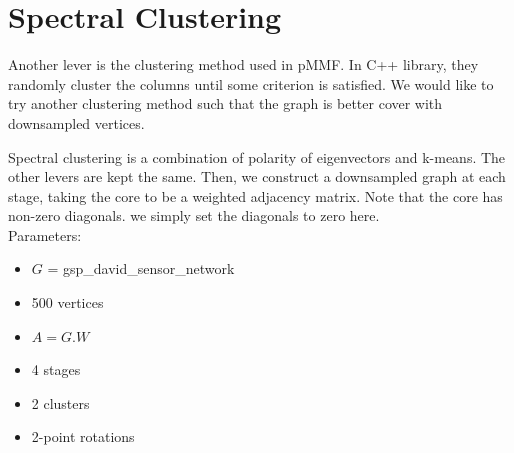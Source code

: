 \documentclass[a4paper]{article}
\begin{document}
\section{Spectral Clustering}
Another lever is the clustering method used in pMMF. In C++ library, they randomly cluster the columns until some criterion is satisfied. We would like to try another clustering method such that the graph is better cover with downsampled vertices.

Spectral clustering is a combination of polarity of eigenvectors and k-means. The other levers are kept the same. Then, we construct a downsampled graph at each stage, taking the core to be a weighted adjacency matrix. Note that the core has non-zero diagonals. we simply set the diagonals to zero here. \\
Parameters:
\begin{itemize}
\item $G$ = gsp\_david\_sensor\_network
\item 500 vertices
\item $A = G.W$
\item 4 stages
\item 2 clusters
\item 2-point rotations
\end{itemize}
\end{document}
